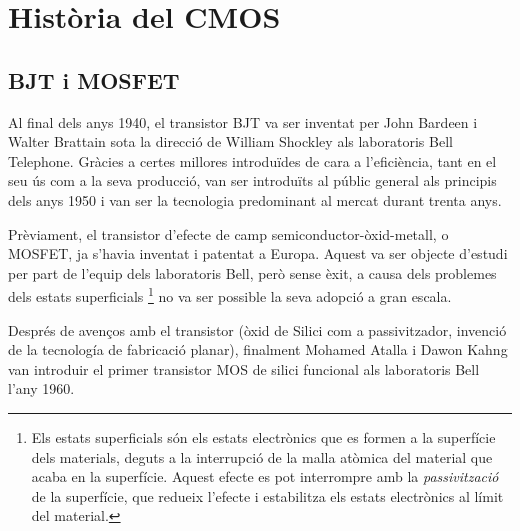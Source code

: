 \documentclass[11pt,a4paper]{article}
\begin{document}
\section{Història del CMOS}

\subsection{BJT i MOSFET}

Al final dels anys 1940, el transistor BJT va ser inventat per John Bardeen i Walter Brattain sota la direcció de William Shockley als laboratoris Bell Telephone. Gràcies a certes millores introduïdes de cara a l'eficiència, tant en el seu ús com a la seva producció, van ser introduïts al públic general als principis dels anys 1950 i van ser la tecnologia predominant al mercat durant trenta anys.

Prèviament, el transistor d'efecte de camp semiconductor-òxid-metall, o MOSFET, ja s'havia inventat i patentat a Europa. Aquest va ser objecte d'estudi per part de l'equip dels laboratoris Bell, però sense èxit, a causa dels problemes dels estats superficials \footnote{Els estats superficials són els estats electrònics que es formen a la superfície dels materials, deguts a la interrupció de la malla atòmica del material que acaba en la superfície. Aquest efecte es pot interrompre amb la \textit{passivització} de la superfície, que redueix l'efecte i estabilitza els estats electrònics al límit del material.} no va ser possible la seva adopció a gran escala.

Després de avenços amb el transistor (òxid de Silici com a passivitzador, invenció de la tecnología de fabricació planar), finalment Mohamed Atalla i Dawon Kahng van introduir el primer transistor MOS de silici funcional als laboratoris Bell l'any 1960. 
\end{document}
